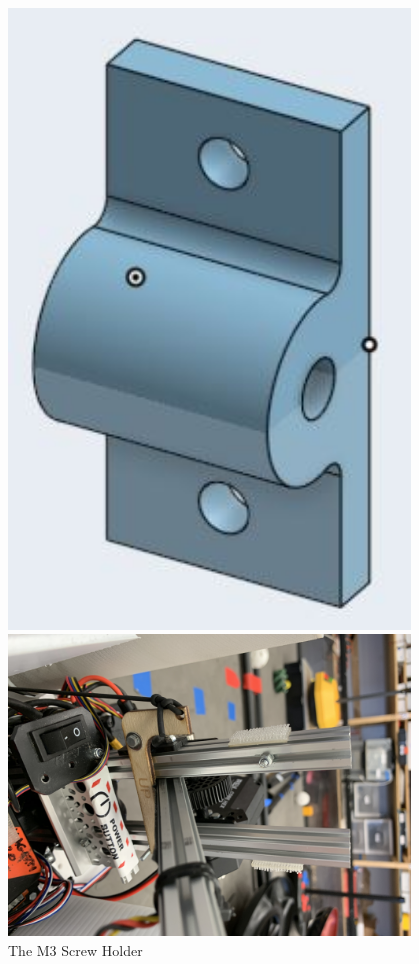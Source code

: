  

\begin{figure}[ht]
\centering
\begin{minipage}[b]{.48\textwidth}
  \centering
  \includegraphics[width=0.95\textwidth]{Meetings/November/11-08-21/11-8-21_Hardware_Figure1 - Nathan Forrer.JPG}
  \caption{The M3 Screw Holder}
  \label{fig:110821_1}
\end{minipage}%
\hfill%
\begin{minipage}[b]{.48\textwidth}
  \centering
  \includegraphics[width=0.95\textwidth]{Meetings/November/11-08-21/11-8-21_Hardware_Figure2 - Nathan Forrer.JPG}

\end{minipage}
\end{figure}
